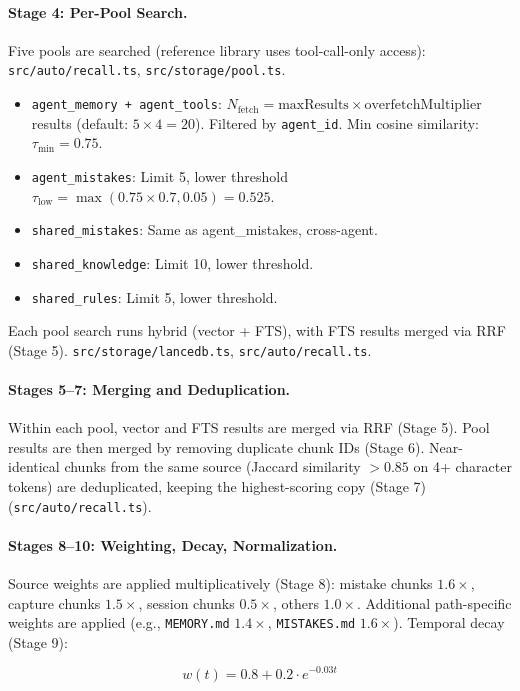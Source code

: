 \documentclass[11pt]{article}
\begin{document}
\paragraph{Stage 4: Per-Pool Search.}
Five pools are searched (reference library uses tool-call-only access):
\texttt{src/auto/recall.ts}, \texttt{src/storage/pool.ts}.
\begin{itemize}[leftmargin=2em, itemsep=2pt]
  \item \texttt{agent\_memory + agent\_tools}: $N_{\text{fetch}} = \text{maxResults} \times
  \text{overfetchMultiplier}$ results (default: $5 \times 4 = 20$). Filtered by
  \texttt{agent\_id}. Min cosine similarity: $\tau_{\min} = 0.75$.
  \item \texttt{agent\_mistakes}: Limit 5, lower threshold $\tau_{\text{low}} =
  \max(0.75 \times 0.7, 0.05) = 0.525$.
  \item \texttt{shared\_mistakes}: Same as agent\_mistakes, cross-agent.
  \item \texttt{shared\_knowledge}: Limit 10, lower threshold.
  \item \texttt{shared\_rules}: Limit 5, lower threshold.
\end{itemize}
Each pool search runs hybrid (vector + FTS), with FTS results merged via RRF (Stage 5).
\texttt{src/storage/lancedb.ts}, \texttt{src/auto/recall.ts}.

\paragraph{Stages 5--7: Merging and Deduplication.}
Within each pool, vector and FTS results are merged via RRF (Stage 5). Pool results are
then merged by removing duplicate chunk IDs (Stage 6). Near-identical chunks from the
same source (Jaccard similarity $> 0.85$ on 4+ character tokens) are deduplicated, keeping
the highest-scoring copy (Stage 7) (\texttt{src/auto/recall.ts}).

\paragraph{Stages 8--10: Weighting, Decay, Normalization.}
Source weights are applied multiplicatively (Stage 8): mistake chunks $1.6\times$,
capture chunks $1.5\times$, session chunks $0.5\times$, others $1.0\times$. Additional
path-specific weights are applied (e.g., \texttt{MEMORY.md} $1.4\times$,
\texttt{MISTAKES.md} $1.6\times$). Temporal decay (Stage 9):

\begin{equation}
  w(t) = 0.8 + 0.2 \cdot e^{-0.03t}
\end{equation}
\end{document}
